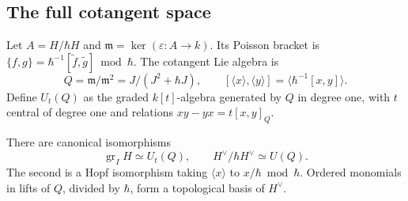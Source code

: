 \subsection{The full cotangent space}

Let \(A=H/\hbar H\) and \(\mathfrak m=\ker(\varepsilon:A\to k)\).
Its Poisson bracket is
\(\{f,g\}=\hbar^{-1}[\widetilde f,\widetilde g]\bmod\hbar\).
The cotangent Lie algebra is
\[
 Q=\mathfrak m/\mathfrak m^2=J/(J^2+\hbar J),\qquad
 [\langle x\rangle,\langle y\rangle]
                  =\langle\hbar^{-1}[x,y]\rangle.
\]
Define \(U_t(Q)\) as the graded \(k[t]\)-algebra generated by
\(Q\) in degree one, with \(t\) central of degree one and
relations \(xy-yx=t[x,y]_Q\).

\begin{theorem}\label{cyrep:thm:cotangent}
There are canonical isomorphisms
\begin{equation}\label{cyrep:eq:cotangent}
 \operatorname{gr}_I H\simeq U_t(Q),\qquad
 H^\vee/\hbar H^\vee\simeq U(Q).
\end{equation}
The second is a Hopf isomorphism taking
\(\langle x\rangle\) to \(x/\hbar\bmod\hbar\).
Ordered monomials in lifts of \(Q\), divided by \(\hbar\),
form a topological basis of \(H^\vee\).
\end{theorem}

